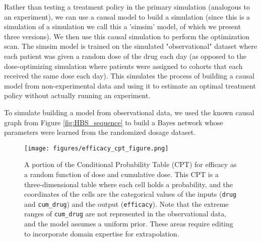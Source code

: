 
Rather than testing a treatment policy in the primary simulation (analogous to an experiment), we can use a causal model to build a simulation (since this is a simulation of a simulation we call this a 'simsim' model, of which we present three versions). We then use this causal simulation to perform the optimization scan. The simsim model is trained on the simulated "observational" dataset where each patient was given a random dose of the drug each day (as opposed to the dose-optimizing simulation where patients were assigned to cohorts that each received the same dose each day). This simulates the process of building a causal model from non-experimental data and using it to estimate an optimal treatment policy without actually running an experiment.

To simulate building a model from observational data, we used the known causal graph from Figure \ref{fig:HBS_sequence} to build a Bayes network whose parameters were learned from the randomized dosage dataset.  



\begin{figure}
  \centering
  \texttt{[image: figures/efficacy\_cpt\_figure.png]}
  \caption{A portion of the Conditional Probability Table (CPT) for efficacy as a random function of dose and cumulative dose. This CPT is a three-dimensional table where each cell holds a probability, and the coordinates of the cells are the categorical values of the inputs (\texttt{drug} and \texttt{cum\_drug}) and the output (\texttt{efficacy}). Note that the extreme ranges of \texttt{cum\_drug} are not represented in the observational data, and the model assumes a uniform prior. These areas require editing to incorporate domain expertise for extrapolation.}
  \label{fig:efficacy_cpt_figure}
\end{figure}

